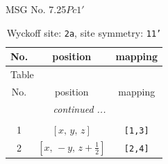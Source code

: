\documentclass[fleqn,8pt]{jsarticle}
\begin{document}
\setcounter{MaxMatrixCols}{32}

\renewcommand{\tablename}{Table~}
\renewcommand{\figurename}{Figure~}
\begin{center}
\LARGE
MSG No. 7.25\quad$Pc1'$
\end{center}
\renewcommand{\arraystretch}{1.2}
\begin{longtable}{ccc}
\caption{Wyckoff site: {\tt 2a}, site symmetry: {\tt 11'}}
 \\
 \hline \hline
No. & position & mapping \\ \hline \endfirsthead

\multicolumn{2}{l}{\tablename\ \thetable{}} \\
 \hline \hline
No. & position & mapping \\ \hline \endhead

 \hline \hline
\multicolumn{2}{r}{\footnotesize\it continued ...} \\ \endfoot

 \hline \hline
\multicolumn{2}{r}{} \\ \endlastfoot

1 & $\left[ x,\, y,\, z \right]$ & {\tt [1,3]} \\ \hline
2 & $\left[ x,\, - y,\, z + \frac{1}{2} \right]$ & {\tt [2,4]} \\
\end{longtable}
\end{document}

